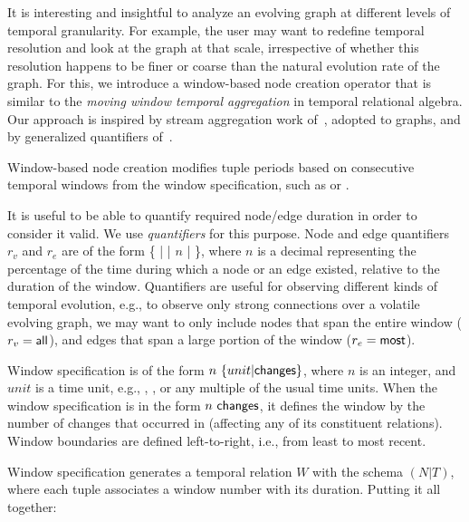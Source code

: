 It is interesting and insightful to analyze an evolving graph at
different levels of temporal granularity.  For example, the user may
want to redefine temporal resolution and look at the graph at that
scale, irrespective of whether this resolution happens to be finer or
coarse than the natural evolution rate of the graph.  For this, we
introduce a window-based node creation operator that is similar to the
{\em moving window temporal aggregation} in temporal relational
algebra.  Our approach is inspired by stream aggregation work
of~\cite{Li2005}, adopted to graphs, and by generalized quantifiers
of~\cite{Hsu1995}.

Window-based node creation modifies tuple periods based on consecutive
temporal windows from the window specification, such as  or .

It is useful to be able to quantify required node/edge duration in
order to consider it valid.  We use {\em quantifiers} for this
purpose.  Node and edge quantifiers $r_v$ and $r_e$ are of the form \{
 |  |  $n$ |  \},
where $n$ is a decimal representing the percentage of the time during
which a node or an edge existed, relative to the duration of the
window.  Quantifiers are useful for observing different kinds of
temporal evolution, e.g., to observe only strong connections over a
volatile evolving graph, we may want to only include nodes that span
the entire window ($r_v=\textsf{all}$), and edges that span a large
portion of the window ($r_e=\textsf{most}$).

Window specification is of the form $n~\{unit|\textsf{changes}\}$,
where $n$ is an integer, and $unit$ is a time unit, e.g., , , or any multiple of the usual time units.
When the window specification is in the form $n~\textsf{changes}$, it
defines the window by the number of changes that occurred in \ttt
(affecting any of its constituent relations). Window boundaries are
defined left-to-right, i.e., from least to most recent.

Window specification generates a temporal relation $W$ with the schema
$(N|T)$, where each tuple associates a window number with its
duration.  Putting it all together:

